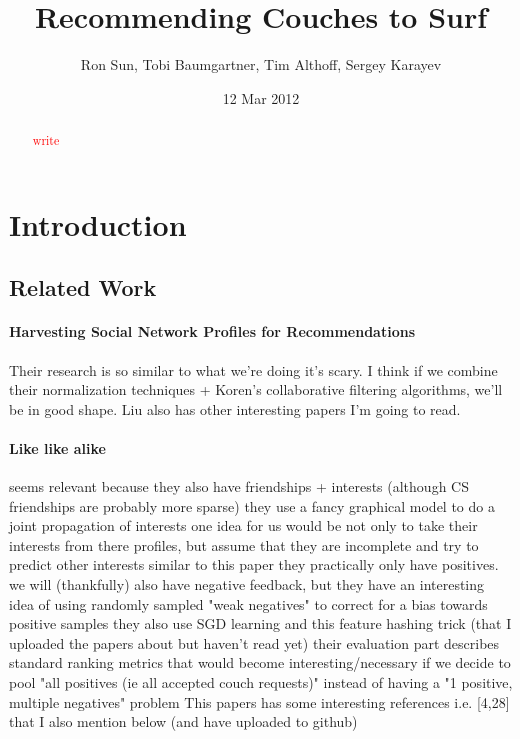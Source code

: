 \documentclass[11pt]{article}
\title{Recommending Couches to Surf}
\author{Ron Sun, Tobi Baumgartner, Tim Althoff, Sergey Karayev}
\date{12 Mar 2012}
\newcommand{\todo}[1]{\textcolor{red}{#1}}
\begin{document}
\maketitle

\begin{abstract}
\todo{write}
\end{abstract}

\section{Introduction}

\subsection{Related Work}

\paragraph{Harvesting Social Network Profiles for Recommendations} \cite{Liu2005}
Their research is so similar to what we're doing it's scary. I think if we combine their normalization techniques + Koren's collaborative filtering algorithms, we'll be in good shape. Liu also has other interesting papers I'm going to read.

\paragraph{Like like alike} \cite{Yang2011}
seems relevant because they also have friendships + interests (although CS friendships are probably more sparse)
they use a fancy graphical model to do a joint propagation of interests
one idea for us would be not only to take their interests from there profiles, but assume that they are incomplete and try to predict other interests similar to this paper
they practically only have positives. we will (thankfully) also have negative feedback, but they have an interesting idea of using randomly sampled "weak negatives" to correct for a bias towards positive samples
they also use SGD learning and this feature hashing trick (that I uploaded the papers about but haven't read yet)
their evaluation part describes standard ranking metrics that would become interesting/necessary if we decide to pool "all positives (ie all accepted couch requests)" instead of having a "1 positive, multiple negatives" problem
This papers has some interesting references i.e. [4,28] that I also mention below (and have uploaded to github)
\end{document}
